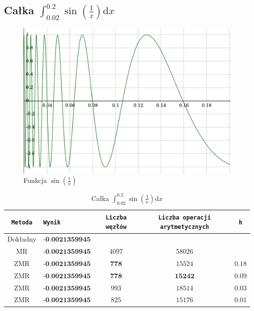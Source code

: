 \documentclass[11pt,leqno]{article}
\begin{document}
\subsection{Całka $\int_{0.02}^{0.2}\sin(\frac{1}{x})\mathrm{d}x$}
\begin{center}\begin{figure}[ht]\begin{center}
    \caption{Funkcja $\sin(\frac{1}{x})$}
    \includegraphics[scale=0.3,angle=0]{sindivx.png}
\end{center}\end{figure}\end{center}
\begin{center}\begin{table}[ht]\begin{center}
    \caption{Całka $\int_{0.02}^{0.2}\sin(\frac{1}{x})\mathrm{d}x$}
    \begin{tabular}{|c|l|c|c|c|} \hline
        \texttt{Metoda} & \texttt{Wynik}            & \texttt{Liczba węzłów} & \texttt{Liczba operacji arytmetycznych} & \texttt{h} \\ \hline
        Dokładny        & $\textbf{-0.0021359945}$  &                        &                                         &            \\ \hline
        MR              & $\textbf{-0.0021359945}$  & $4097$                 & $58026$                                 &            \\ \hline
        ZMR             & $\textbf{-0.0021359945}$  & $\textbf{778}$         & $15524$                                 & $0.18$     \\ \hline
        ZMR             & $\textbf{-0.0021359945}$  & $\textbf{778}$         & $\textbf{15242}$                        & $0.09$     \\ \hline
        ZMR             & $\textbf{-0.0021359945}$  & $993$                  & $18514$                                 & $0.03$     \\ \hline
        ZMR             & $\textbf{-0.0021359945}$  & $825$                  & $15176$                                 & $0.01$     \\ \hline
    \end{tabular}
\end{center}\end{table}\end{center}
\end{document}
